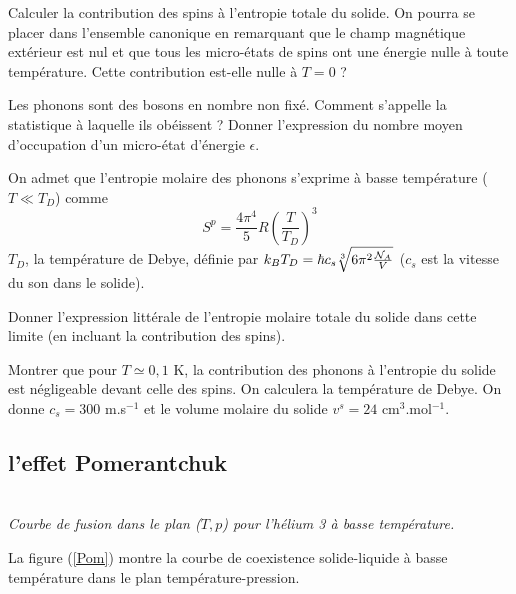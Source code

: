 \documentclass[utf8, 11pt]{feuille}
\begin{document}
\question
Calculer la contribution des spins à l'entropie totale du solide. On pourra se placer dans l'ensemble canonique en remarquant que le champ magnétique extérieur est nul et que tous les micro-états de spins ont une énergie nulle à toute température. Cette contribution est-elle nulle à $T = 0$ ?

\question
Les phonons sont des bosons en nombre non fixé. Comment s'appelle la statistique à laquelle ils obéissent ? Donner l'expression du nombre moyen d'occupation d'un micro-état d'énergie $\epsilon$.

On admet que l'entropie molaire des phonons s'exprime à basse température ($T \ll T_D$) comme
$$
S^p=\frac{4\pi^4}{5} R \left(\frac{T}{T_D}\right)^3
$$
$T_D$, la température de Debye, définie par $k_B T_D=\hbar c_s \sqrt[3]{6\pi^2 \frac{{\cal N}_A }{V}}$ ($c_s$ est la vitesse du son dans le solide).

\question
Donner l'expression littérale de l'entropie molaire totale du solide dans cette limite (en incluant la
contribution des spins).

\question
Montrer que pour $T \simeq 0,1$ K, la contribution des phonons à l'entropie du solide est
négligeable devant celle des spins. On calculera la température de Debye. On donne $c_s=300$ m.s$^{-1}$ et le volume molaire du solide $v^s = 24$ cm$^3$.mol$^{-1}$.

\subsection*{l'effet Pomerantchuk}


\begin{center} \\
\textit{Courbe de fusion dans le plan ($T, p$) pour l'hélium 3 à basse température.}
\label{Pom}
\end{center}

La figure (\ref{Pom}) montre la courbe de coexistence solide-liquide à basse température dans le plan température-pression.
\end{document}
